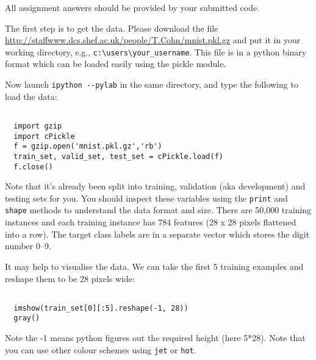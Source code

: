 \documentclass{article}
\begin{document}
All assignment answers should be provided by your submitted code.

The first step is to get the data. Please download the file 
\url{http://staffwww.dcs.shef.ac.uk/people/T.Cohn/mnist.pkl.gz}
and put it in your working directory, e.g., \texttt{c:\textbackslash{}users\textbackslash{}your\_username}. This file is in a python binary format which can be loaded easily using the pickle module.

Now launch \lstinline+ipython --pylab+ in the same directory, and type the following to load the data:
\begin{verbatim}

  import gzip 
  import cPickle 
  f = gzip.open('mnist.pkl.gz','rb') 
  train_set, valid_set, test_set = cPickle.load(f) 
  f.close()
\end{verbatim}
Note that it’s already been split into training, validation (aka development) and testing sets for you. You should inspect these variables using the \lstinline+print+ and \lstinline+shape+ methods to understand the data format and size. There are 50,000 training instances and each training instance has 784 features (28 x 28 pixels flattened into a row). The target class labels are in a separate vector which stores the digit number 0--9.

It may help to visualise the data. We can take the first 5 training examples and reshape them to be 28 pixels wide:
\begin{verbatim}

  imshow(train_set[0][:5].reshape(-1, 28)) 
  gray()
\end{verbatim}
Note the -1 means python figures out the required height (here 5*28). Note that you can use other colour schemes using \lstinline+jet+ or \lstinline+hot+. 
\end{document}
